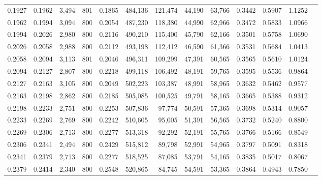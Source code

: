 \begin{tabular}{rrrrrrrrrrrrr}
0.1927 & 0.1962 &  3,494 &   801 &                                     0.1865 & 484,136 & 121,474 &  44,190 &  63,766 & 0.3442 & 0.5907 & 1.1252 \\
0.1962 & 0.1994 &  3,094 &   800 &                                     0.2054 & 487,230 & 118,380 &  44,990 &  62,966 & 0.3472 & 0.5833 & 1.0966 \\
0.1994 & 0.2026 &  2,980 &   800 &                                     0.2116 & 490,210 & 115,400 &  45,790 &  62,166 & 0.3501 & 0.5758 & 1.0690 \\
0.2026 & 0.2058 &  2,988 &   800 &                                     0.2112 & 493,198 & 112,412 &  46,590 &  61,366 & 0.3531 & 0.5684 & 1.0413 \\
0.2058 & 0.2094 &  3,113 &   801 &                                     0.2046 & 496,311 & 109,299 &  47,391 &  60,565 & 0.3565 & 0.5610 & 1.0124 \\
0.2094 & 0.2127 &  2,807 &   800 &                                     0.2218 & 499,118 & 106,492 &  48,191 &  59,765 & 0.3595 & 0.5536 & 0.9864 \\
0.2127 & 0.2163 &  3,105 &   800 &                                     0.2049 & 502,223 & 103,387 &  48,991 &  58,965 & 0.3632 & 0.5462 & 0.9577 \\
0.2163 & 0.2198 &  2,862 &   800 &                                     0.2185 & 505,085 & 100,525 &  49,791 &  58,165 & 0.3665 & 0.5388 & 0.9312 \\
0.2198 & 0.2233 &  2,751 &   800 &                                     0.2253 & 507,836 &  97,774 &  50,591 &  57,365 & 0.3698 & 0.5314 & 0.9057 \\
0.2233 & 0.2269 &  2,769 &   800 &                                     0.2242 & 510,605 &  95,005 &  51,391 &  56,565 & 0.3732 & 0.5240 & 0.8800 \\
0.2269 & 0.2306 &  2,713 &   800 &                                     0.2277 & 513,318 &  92,292 &  52,191 &  55,765 & 0.3766 & 0.5166 & 0.8549 \\
0.2306 & 0.2341 &  2,494 &   800 &                                     0.2429 & 515,812 &  89,798 &  52,991 &  54,965 & 0.3797 & 0.5091 & 0.8318 \\
0.2341 & 0.2379 &  2,713 &   800 &                                     0.2277 & 518,525 &  87,085 &  53,791 &  54,165 & 0.3835 & 0.5017 & 0.8067 \\
0.2379 & 0.2414 &  2,340 &   800 &                                     0.2548 & 520,865 &  84,745 &  54,591 &  53,365 & 0.3864 & 0.4943 & 0.7850 \\

\end{tabular}
